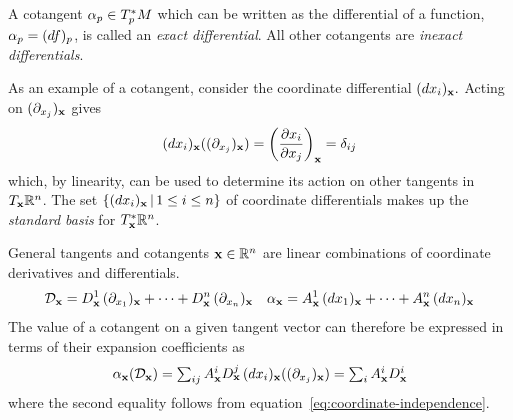 \documentclass[11pt]{article}
\numberwithin{equation}{section}
\begin{document}
\begin{dfn}
\label{eq:exact-differential}
A cotangent $\alpha _p\in T_p^*M$ which can be written as the differential of a function, $\alpha _p=(df)_p$, is called an \textit{exact differential}.
All other cotangents are \textit{inexact differentials}.
\end{dfn}


\begin{ex}
As an example of a cotangent, consider the coordinate differential $(dx_i)_{\mathbf{x}}.$
Acting on $(\partial_{x_j})_{\mathbf{x}}$ gives
\begin{align}
\label{eq:coordinate-independence}
  (dx_i)_{\mathbf{x}}
  ((\partial_{x_j})_{\mathbf{x}})
=
  \left(\frac {\partial x_i}{\partial x_j}\right)_{\mathbf{x}}
=
  \delta _{ij}
\end{align}
which, by linearity, can be used to determine its action on other tangents in $T_{\mathbf{x}}\mathbb{R}^n$.
The set $\{(dx_i)_{\mathbf{x}}\,|\,1\leq i\leq n\}$  of coordinate differentials makes up the \textit{standard basis} for $T_{\mathbf{x}}^*\mathbb{R}^n$.
\end{ex}


\begin{ex}
\label{ex:tangent-cotangent-expansions}
General tangents and cotangents $\mathbf{x}\in\mathbb{R}^n$ are linear combinations of coordinate derivatives and differentials.
\begin{align}
\label{eq:tangent-cotangent-expansions}
  \mathcal{D}_{\mathbf{x}}
=
  D_{\mathbf{x}}^1\,
  (\partial_{x_1})_{\mathbf{x}}
+
\cdots
+
  D_{\mathbf{x}}^n\,
  (\partial_{x_n})_{\mathbf{x}}
&&
  \alpha _{\mathbf{x}}
=
  A_{\mathbf{x}}^1\,
  (dx_1)_{\mathbf{x}}
+
\cdots
+
  A_{\mathbf{x}}^n\,
  (dx_n)_{\mathbf{x}}
\end{align}
The value of a cotangent on a given tangent vector can therefore be expressed in terms of their expansion coefficients as
\begin{align}
\label{eq:cotangent-tangent-dot-product-expansion}
{\textstyle
  \ensuremath{\alpha }_{\ensuremath{\mathbf{x}}}(\ensuremath{\mathcal{D}}_{\ensuremath{\mathbf{x}}})
=
  \sum_{ij}
  A_{\ensuremath{\mathbf{x}}}^i
  D_{\ensuremath{\mathbf{x}}}^j\,
  (dx_i)_{\ensuremath{\mathbf{x}}}((\ensuremath{\partial}_{x_j})_{\ensuremath{\mathbf{x}}})
=
  \sum_i
  A_{\ensuremath{\mathbf{x}}}^i
  D_{\ensuremath{\mathbf{x}}}^i
}
\end{align}
where the second equality follows from equation~\ref{eq:coordinate-independence}.
\end{ex}


\begin{prop}
\vspace{5pt}
\end{prop}
\end{document}
